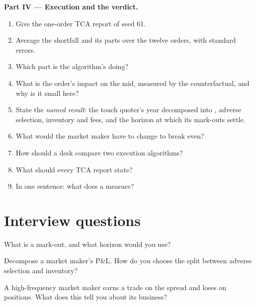 \begin{problem}
\medskip\noindent\textbf{Part IV --- Execution and the verdict.}
\begin{enumerate}[resume]
\item Give the one-order TCA report of seed 61.
\item Average the shortfall and its parts over the twelve orders, with standard errors.
\item Which part is the algorithm's doing?
\item What is the order's impact on the mid, measured by the counterfactual, and why is it small here?
\item State the \emph{named result}: the touch quoter's year decomposed into , adverse selection, inventory and fees, and the horizon at which its
mark-outs settle.
\item What would the market maker have to change to break even?
\item How should a desk compare two execution algorithms?
\item What should every TCA report state?
\item In one sentence: what does a  measure?
\end{enumerate}
\end{problem}

\section{Interview questions}

\begin{interviewq}\label{iq:rs:measuring-market-making-and-execution:1}
What is a mark-out, and what horizon would you use?
\end{interviewq}

\begin{interviewq}\label{iq:rs:measuring-market-making-and-execution:2}
Decompose a market maker's P\&L. How do you choose the split between adverse selection and inventory?
\end{interviewq}

\begin{interviewq}\label{iq:rs:measuring-market-making-and-execution:3}
A high-frequency market maker earns  a trade on the spread and loses  on positions. What does this tell you about its business?
\end{interviewq}

